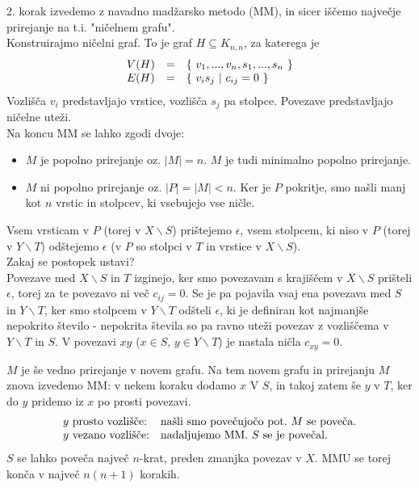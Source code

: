 \documentclass[11pt, a4paper]{article}
\begin{document}
    2. korak izvedemo z navadno madžarsko metodo (MM), in sicer iščemo največje prirejanje na t.i. "ničelnem grafu". \\
    Konstruirajmo ničelni graf. To je graf \(H \subseteq K_{n,n}\), za katerega je 
    \[
        \begin{array}{ l l l }
            V(H) & = & \{\ v_1,...,v_n,s_1,...,s_n\ \} \\
            E(H) & = & \{\ v_i s_j\ |\ c_{ij}=0\ \}
        \end{array}  
    \]
    Vozlišča \(v_i\) predstavljajo vrstice, vozlišča \(s_j\) pa stolpce. Povezave predstavljajo ničelne uteži. \\
    Na koncu MM se lahko zgodi dvoje:
    \begin{itemize}
        \item \(M\) je popolno prirejanje oz. \(|M|=n\). \(M\) je tudi minimalno popolno prirejanje.
        \item \(M\) ni popolno prirejanje oz. \(|P| = |M| < n\). Ker je \(P\) pokritje, smo našli manj kot \(n\) vrstic in stolpcev, ki vsebujejo vse ničle.
    \end{itemize}

    Vsem vrsticam v \(P\) (torej v \(X \backslash S\)) prištejemo \(\epsilon\), vsem stolpcem, ki niso v \(P\) (torej v \(Y \backslash T\)) odštejemo \(\epsilon\) (v \(P\) so stolpci v \(T\) in vrstice v \(X \backslash S\)). \\
    Zakaj se postopek ustavi? \\
    Povezave med \(X \backslash S\) in \(T\) izginejo, ker smo povezavam s krajiščem v \(X \backslash S\) prišteli \(\epsilon\), torej za te povezavo ni več \(c_{ij} = 0\). Se je pa pojavila vsaj ena povezava med \(S\) in \(Y \backslash T\), ker smo stolpcem v \(Y \backslash T\) odšteli \(\epsilon\), ki je definiran kot najmanjše nepokrito število - nepokrita števila so pa ravno uteži povezav z vozliščema v \(Y \backslash T\) in \(S\). V povezavi \(xy\) (\(x \in S\), \(y \in Y \backslash T\)) je nastala ničla \(c_{xy}=0\).
    \par
    \(M\) je še vedno prirejanje v novem grafu. Na tem novem grafu in prirejanju \(M\) znova izvedemo MM: v nekem koraku dodamo \(x\) V \(S\), in takoj zatem še \(y\) v \(T\), ker do \(y\) pridemo iz \(x\) po prosti povezavi. 
    \[
        \begin{array}{ l l }
            y\ \text{prosto vozlišče:} & \text{našli smo povečujočo pot.}\ M\ \text{se poveča.} \\
            y\ \text{vezano vozlišče:} & \text{nadaljujemo MM.}\ S\ \text{se je povečal.}
        \end{array}    
    \]
    \(S\) se lahko poveča največ \(n\)-krat, preden zmanjka povezav v \(X\). MMU se torej konča v največ \(n(n+1)\) korakih.
\end{document}
